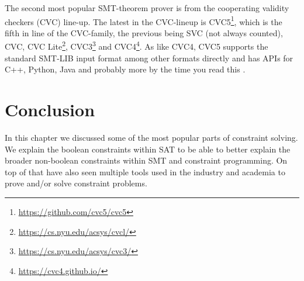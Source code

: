 The second most popular SMT-theorem prover is from the cooperating validity checkers (CVC) line-up. The latest in the CVC-lineup is CVC5\footnote{\url{https://github.com/cvc5/cvc5}}, which is the fifth in line of the CVC-family, the previous being SVC (not always counted), CVC, 
CVC Lite\footnote{\url{https://cs.nyu.edu/acsys/cvcl/}}, 
CVC3\footnote{\url{https://cs.nyu.edu/acsys/cvc3/}}\cite{71barrett2007cvc3} and 
CVC4\footnote{\url{https://cvc4.github.io/}}.
As like CVC4, CVC5 supports the standard SMT-LIB input format among other formats directly and has APIs for C++, Python, Java and probably more by the time you read this \cite{62barrettcvc5, 63barbosa2022cvc5}.

\section{Conclusion}
\label{CS:conclusion}
In this chapter we discussed some of the most popular parts of constraint solving. We explain the boolean constraints within SAT to be able to better explain the broader non-boolean constraints within SMT and constraint programming. On top of that have also seen multiple tools used in the industry and academia to prove and/or solve constraint problems.

